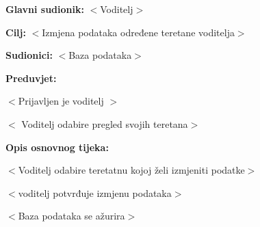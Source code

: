 					\noindent {}
					\begin{packed_item}
	
						\item \textbf{Glavni sudionik: } $<$Voditelj$>$
						\item  \textbf{Cilj:} $<$Izmjena podataka određene teretane voditelja$>$
						\item  \textbf{Sudionici:} $<$Baza podataka$>$
						\item  \textbf{Preduvjet:}
						\item[] \begin{packed_enum}
	
							\item $<$Prijavljen je voditelj $>$
							\item $<$ Voditelj odabire pregled svojih teretana$>$

						\end{packed_enum}
						\item  \textbf{Opis osnovnog tijeka:}
						
						\item[] \begin{packed_enum}
	
							\item $<$Voditelj odabire teretatnu kojoj želi izmjeniti podatke$>$
							\item $<$voditelj potvrđuje izmjenu podataka$>$
							\item $<$Baza podataka se ažurira$>$
						\end{packed_enum}
						
						
					\end{packed_item}
					
